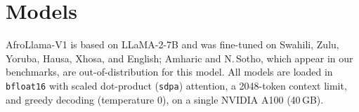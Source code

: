 \documentclass[pmlr]{jmlr}%
\begin{document}
\appendix
\vspace{2.5em}
\par
\vspace{0.6em}

\section{Models}\label{app:models}
\begin{table}[H]\centering\small
\caption{Open-weight models evaluated.}
\label{tab:models}
\end{table}

AfroLlama-V1 is based on LLaMA-2-7B and was fine-tuned on Swahili, Zulu, Yoruba, Hausa, Xhosa, and
English; Amharic and N.\,Sotho, which appear in our benchmarks, are out-of-distribution for this
model. All models are loaded in \texttt{bfloat16} with scaled dot-product (\texttt{sdpa}) attention,
a 2048-token context limit, and greedy decoding (temperature 0), on a single NVIDIA A100 (40\,GB).
\end{document}
